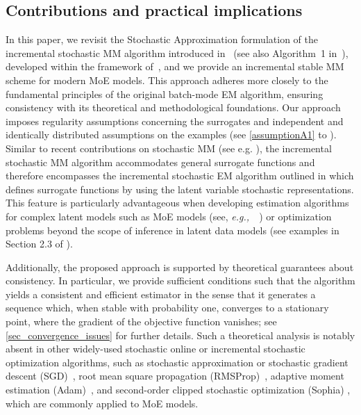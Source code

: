 \documentclass{article}
\def\eg{{\em e.g.,~}}
\begin{document}
\subsection{Contributions and practical implications}\label{sec_intro_overall_contribution}
In this paper, we revisit the Stochastic Approximation formulation of the incremental stochastic MM algorithm introduced in~\cite{nguyen_online_2023} (see also Algorithm~1 in~\cite{dieuleveut_federated_2025}), developed within the framework of~\cite{cappe_Online_2009}, and we provide an incremental stable MM scheme for modern MoE models. This approach adheres more closely to the fundamental principles of the original batch-mode EM algorithm, ensuring consistency with its theoretical and methodological foundations. Our approach imposes regularity assumptions concerning the surrogates and independent and identically distributed assumptions on the examples (see \cref{assumptionA1} to ). Similar to recent contributions on stochastic MM (see e.g. \cite{fort_stochastic_2020,dieuleveut_federated_2025}), the incremental stochastic MM algorithm  \cite{nguyen_online_2023,dieuleveut_federated_2025} accommodates general surrogate functions and therefore encompasses the incremental stochastic EM algorithm outlined in \cite{cappe_Online_2009,cappe_online_2011} which defines surrogate functions by using the latent variable stochastic representations. This feature is particularly advantageous when developing estimation algorithms for complex latent models such as MoE models (see, \eg~\cite{nguyen_laplace_2016}) or optimization problems beyond the scope of inference in latent data models (see examples in Section 2.3 of \cite{dieuleveut_federated_2025}).

Additionally, the proposed approach is supported by theoretical guarantees about consistency. In particular, we provide sufficient conditions such that the algorithm yields a consistent and efficient estimator in the sense that it generates a sequence which, when stable with probability one, converges to a stationary point, where the gradient of the objective function vanishes; see \cref{sec_convergence_issues} for further details. Such a theoretical analysis is notably absent in other widely-used stochastic online or incremental stochastic optimization algorithms, such as stochastic approximation or stochastic gradient descent (SGD)~\cite{robbins_stochastic_1951}, root mean square propagation (RMSProp)~\cite{hinton_neural_2012}, adaptive moment estimation (Adam)~\cite{kingma_adam_2015,dereich_ode_2025}, and second-order clipped stochastic optimization (Sophia) \cite{liu_sophia_2024}, which are commonly applied to MoE models.
\end{document}
